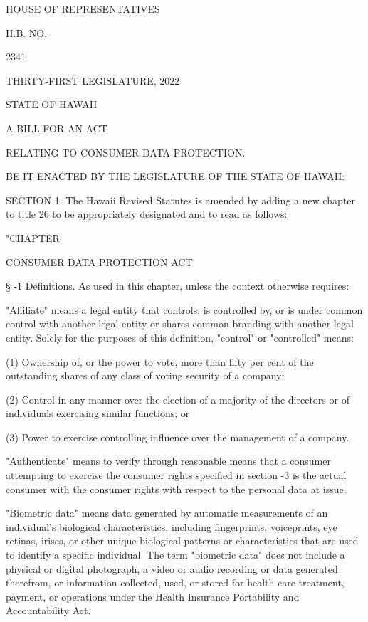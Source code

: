 HOUSE OF REPRESENTATIVES

H.B. NO.

2341

THIRTY-FIRST LEGISLATURE, 2022

 

STATE OF HAWAII

 

 

 

 

 

 

A BILL FOR AN ACT

 

 

RELATING TO CONSUMER DATA PROTECTION.

 

 

BE IT ENACTED BY THE LEGISLATURE OF THE STATE OF HAWAII:

 


     SECTION 1.  The Hawaii Revised Statutes is amended by adding a new chapter to title 26 to be appropriately designated and to read as follows:

"CHAPTER

CONSUMER DATA PROTECTION ACT

     §   -1  Definitions.  As used in this chapter, unless the context otherwise requires:

     "Affiliate" means a legal entity that controls, is controlled by, or is under common control with another legal entity or shares common branding with another legal entity.  Solely for the purposes of this definition, "control" or "controlled" means:

     (1)  Ownership of, or the power to vote, more than fifty per cent of the outstanding shares of any class of voting security of a company;

     (2)  Control in any manner over the election of a majority of the directors or of individuals exercising similar functions; or

     (3)  Power to exercise controlling influence over the management of a company.

     "Authenticate" means to verify through reasonable means that a consumer attempting to exercise the consumer rights specified in section    -3 is the actual consumer with the consumer rights with respect to the personal data at issue.

     "Biometric data" means data generated by automatic measurements of an individual's biological characteristics, including fingerprints, voiceprints, eye retinas, irises, or other unique biological patterns or characteristics that are used to identify a specific individual.  The term "biometric data" does not include a physical or digital photograph, a video or audio recording or data generated therefrom, or information collected, used, or stored for health care treatment, payment, or operations under the Health Insurance Portability and Accountability Act.

